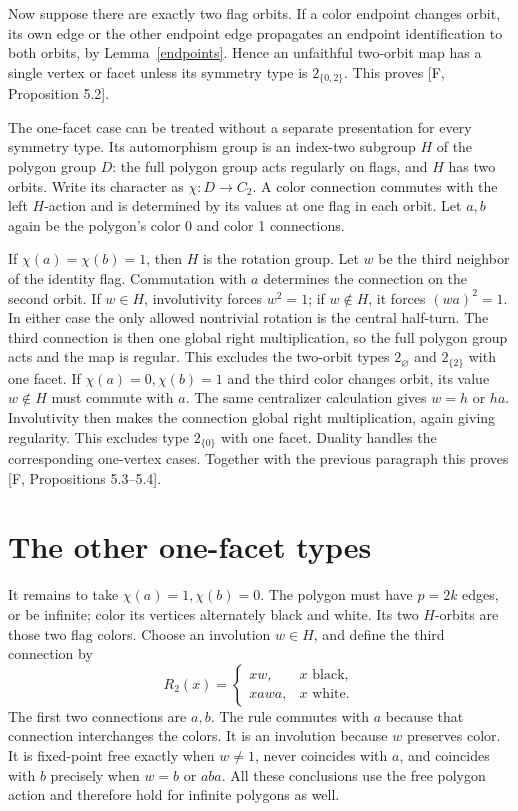 \documentclass[a4paper,11pt]{article}
\begin{document}
Now suppose there are exactly two flag orbits. If a color endpoint
changes orbit, its own edge or the other endpoint edge propagates
an endpoint identification to both orbits, by
Lemma~\ref{endpoints}. Hence an unfaithful two-orbit map has a
single vertex or facet unless its symmetry type is $2_{\{0,2\}}$.
This proves [F, Proposition 5.2].

The one-facet case can be treated without a separate presentation
for every symmetry type. Its automorphism group is an index-two
subgroup $H$ of the polygon group $D$: the full polygon group acts
regularly on flags, and $H$ has two orbits. Write its character
as $\chi:D\to C_2$. A color connection commutes with the left
$H$-action and is determined by its values at one flag in each orbit.
Let $a,b$ again be the polygon's color 0 and color 1 connections.

If $\chi(a)=\chi(b)=1$, then $H$ is the rotation group. Let $w$
be the third neighbor of the identity flag. Commutation with $a$
determines the connection on the second orbit. If $w\in H$,
involutivity forces $w^2=1$; if $w\notin H$, it forces $(wa)^2=1$.
In either case the only allowed nontrivial rotation is the central
half-turn. The third connection is then one global right multiplication,
so the full polygon group acts and the map is regular. This excludes
the two-orbit types $2_\varnothing$ and $2_{\{2\}}$ with one facet.
If $\chi(a)=0,\chi(b)=1$ and the third color changes orbit, its
value $w\notin H$ must commute with $a$. The same centralizer
calculation gives $w=h$ or $ha$. Involutivity then makes the
connection global right multiplication, again giving regularity.
This excludes type $2_{\{0\}}$ with one facet. Duality handles
the corresponding one-vertex cases. Together with the previous
paragraph this proves [F, Propositions 5.3--5.4].

\section{The other one-facet types}
It remains to take $\chi(a)=1,\chi(b)=0$. The polygon must have
$p=2k$ edges, or be infinite; color its vertices alternately black
and white. Its two $H$-orbits are those two flag colors. Choose
an involution $w\in H$, and define the third connection by
\[
 R_2(x)=
 \begin{cases}xw,&x\text{ black},\\ xawa,&x\text{ white}.
 \end{cases}
 \tag{3}
\]
The first two connections are $a,b$. The rule commutes with $a$
because that connection interchanges the colors. It is an involution
because $w$ preserves color. It is fixed-point free exactly when
$w\ne1$, never coincides with $a$, and coincides with $b$ precisely
when $w=b$ or $aba$. All these conclusions use the free polygon
action and therefore hold for infinite polygons as well.
\end{document}
